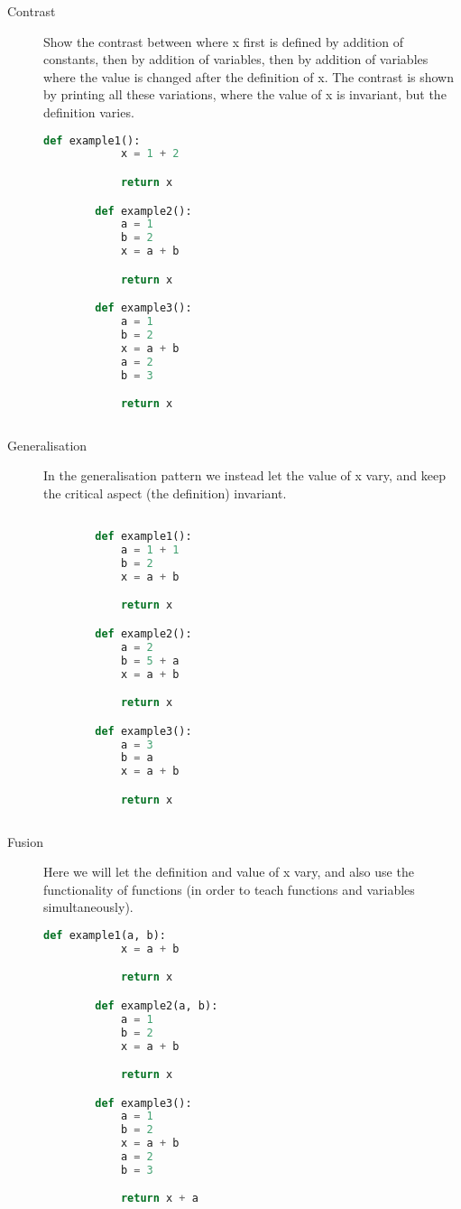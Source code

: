 \begin{description}
    \item [Contrast] Show the contrast between where x first is defined by 
addition of constants, then by addition of variables, then by addition 
of variables where the value is changed after the definition of x. The 
contrast is shown by printing all these variations, where the value of 
x is invariant, but the definition varies. 
    \begin{lstlisting}[language=Python]
        def example1():
            x = 1 + 2

            return x

        def example2():
            a = 1
            b = 2
            x = a + b

            return x

        def example3():
            a = 1
            b = 2
            x = a + b
            a = 2
            b = 3

            return x
            
    \end{lstlisting}

    \item [Generalisation] In the generalisation pattern we instead let the 
value of x vary, and keep the critical aspect (the definition) 
invariant. 
    \begin{lstlisting}[language=Python]

        def example1():
            a = 1 + 1
            b = 2
            x = a + b

            return x

        def example2():
            a = 2
            b = 5 + a
            x = a + b

            return x

        def example3():
            a = 3
            b = a
            x = a + b

            return x
            
    \end{lstlisting}

    \item [Fusion] Here we will let the definition and value of x vary, and 
also use the functionality of functions (in order to teach functions 
and variables simultaneously). 

    \begin{lstlisting}[language=Python]
        def example1(a, b):
            x = a + b

            return x

        def example2(a, b):
            a = 1
            b = 2
            x = a + b

            return x

        def example3():
            a = 1
            b = 2
            x = a + b
            a = 2
            b = 3

            return x + a
            
    \end{lstlisting}
    
\end{description}



